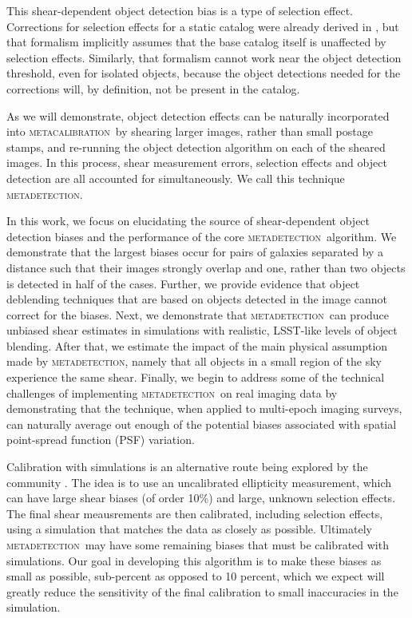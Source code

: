 \documentclass[fleqn,useAMS,usenatbib]{mnras}
\newcommand{\mcal}{\textsc{metacalibration}}
\newcommand{\mdet}{\textsc{metadetection}}
\begin{document}
This shear-dependent object detection bias is a type of selection effect.
Corrections for selection effects for a static catalog were already derived in
\cite{SheldonMcal2017}, but that formalism implicitly assumes that the base
catalog itself is unaffected by selection effects.  Similarly, that formalism
cannot work near the object detection threshold, even for isolated objects,
because the object detections needed for the corrections will, by definition,
not be present in the catalog.

As we will demonstrate, object detection effects can be naturally incorporated
into \mcal\ by shearing larger images, rather than small postage stamps, and
re-running the object detection algorithm on each of the sheared images. In
this process, shear measurement errors, selection effects and object detection
are all accounted for simultaneously. We call this technique \mdet.

In this work, we focus on elucidating the source of shear-dependent object
detection biases and the performance of the core \mdet\ algorithm. We
demonstrate that the largest biases occur for pairs of galaxies separated by a
distance such that their images strongly overlap and one, rather than two
objects is detected in half of the cases.  Further, we provide evidence that
object deblending techniques that are based on objects detected in the image
cannot correct for the biases. Next, we demonstrate that \mdet\ can produce
unbiased shear estimates in simulations with realistic, LSST-like
\citep[e.g.,][]{chang2013} levels of object blending.  After that, we estimate
the impact of the main physical assumption made by \mdet, namely that all
objects in a small region of the sky experience the same shear. Finally, we
begin to address some of the technical challenges of implementing \mdet\ on
real imaging data by demonstrating that the technique, when applied to
multi-epoch imaging surveys, can naturally average out enough of the potential
biases associated with spatial point-spread function (PSF) variation.

Calibration with simulations is an alternative route being explored by the
community \citep[see, e.g.,][]{HSCY1shear,KIDS450shear}.  The idea is to use an
uncalibrated ellipticity measurement, which can have large shear biases (of
order 10\%) and large, unknown selection effects.  The final shear meausrements
are then calibrated, including selection effects, using a simulation that
matches the data as closely as possible.  Ultimately \mdet\ may have some
remaining biases that must be calibrated with simulations.  Our goal in
developing this algorithm is to make these biases as small as possible,
sub-percent as opposed to 10 percent, which we expect will greatly reduce the
sensitivity of the final calibration to small inaccuracies in the simulation.
\end{document}
